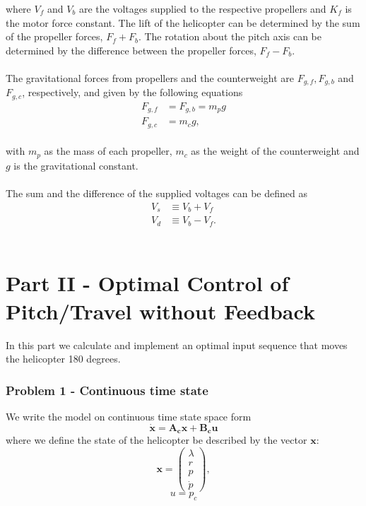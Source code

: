\documentclass[12pt, a4paper]{article}%
\begin{document}
where $V_f$ and $V_b$ are the voltages supplied to the respective propellers and $K_f$ is the motor force constant. The lift of the helicopter can be determined by the sum of the propeller forces, $F_f + F_b$. The rotation about the pitch axis can be determined by the difference between the propeller forces, $F_f - F_b$. 
\\\\
The gravitational forces from propellers and the counterweight are $F_{g,f}, F_{g,b}$ and $F_{g,c}$, respectively, and given by the following equations
\begin{subequations}
\label{Fg}
\begin{alignat}{2}
F_{g,f} & = F_{g,b} = m_p g \\
F_{g,c} & = m_c g,
\end{alignat}
\end{subequations}
\\
with $m_p$ as the mass of each propeller, $m_c$ as the weight of the counterweight and $g$ is the gravitational constant. 
\\\\
The sum and the difference of the supplied voltages can be defined as
\begin{subequations}
\label{V}
\begin{alignat}{2}
V_s & \equiv V_b + V_f\\
V_d & \equiv V_b - V_f.
\end{alignat}
\end{subequations}
\\
\section{Part II - Optimal Control of Pitch/Travel without Feedback}
In this part we calculate and implement an optimal input sequence that moves the helicopter 180 degrees.

\subsubsection{Problem 1 - Continuous time state}
We write the model on continuous time state space form
\begin{equation}
\mathbf{\dot{x}} = \mathbf{A_c} \mathbf{x} + \mathbf{B_c} \mathbf{u}
\label{linsys}
\end{equation}
where we define the state of the helicopter be described by the vector $\mathbf{x}$: 
\begin{equation}
\mathbf{x} =
\begin{pmatrix}
\lambda \\
r \\
p \\
\dot{p}
\end{pmatrix},
\label{xmat2}
\end{equation}
\begin{equation}
u = p_c
\label{u}
\end{equation}
\\
\end{document}
